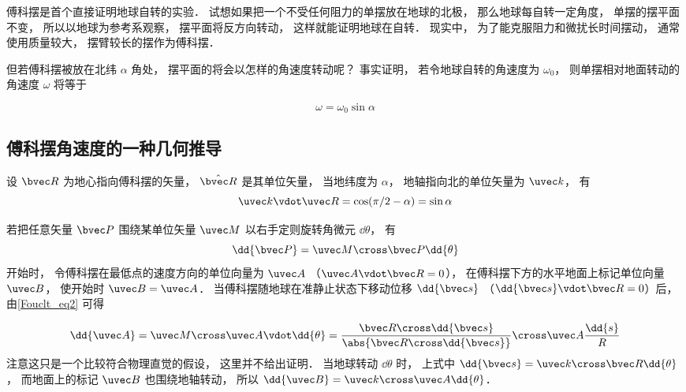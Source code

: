 

傅科摆是首个直接证明地球自转的实验． 试想如果把一个不受任何阻力的单摆放在地球的北极， 那么地球每自转一定角度， 单摆的摆平面不变， 所以以地球为参考系观察， 摆平面将反方向转动， 这样就能证明地球在自转． 现实中， 为了能克服阻力和微扰长时间摆动， 通常使用质量较大， 摆臂较长的摆作为傅科摆．

但若傅科摆被放在北纬 $\alpha$ 角处， 摆平面的将会以怎样的角速度转动呢？ 事实证明， 若令地球自转的角速度为 $\omega_0$， 则单摆相对地面转动的角速度 $\omega$ 将等于

\begin{equation}
\omega = \omega_0 \sin\alpha
\end{equation}

\subsection{傅科摆角速度的一种几何推导}
设 $\bvec R$ 为地心指向傅科摆的矢量， $\hat {\bvec R}$ 是其单位矢量， 当地纬度为 $\alpha$， 地轴指向北的单位矢量为 $\uvec k$， 有
\begin{equation}
\uvec k\vdot \uvec R = \cos(\pi/2 - \alpha) = \sin\alpha
\end{equation}

若把任意矢量 $\bvec P$ 围绕某单位矢量 $\uvec M$ 以右手定则旋转角微元 $\dd{\theta}$， 有
\begin{equation}\label{Fouclt_eq2}
\dd{\bvec P} = \uvec M \cross \bvec P \dd{\theta}
\end{equation}
开始时， 令傅科摆在最低点的速度方向的单位向量为 $\uvec A$ （$\uvec A\vdot \bvec R = 0$）， 在傅科摆下方的水平地面上标记单位向量 $\uvec B$， 使开始时 $\uvec B = \uvec A$． 当傅科摆随地球在准静止状态下移动位移 $\dd{\bvec s}$ （$\dd{\bvec s} \vdot\bvec R = 0$）后， 由\autoref{Fouclt_eq2} 可得

\begin{equation}
\dd{\uvec A} = \uvec M\cross \uvec A\vdot \dd{\theta} = 
\frac{\bvec R\cross \dd{\bvec s}}{\abs{\bvec R\cross \dd{\bvec s}}} \cross \uvec A \frac{\dd{s}}{R}
\end{equation}
注意这只是一个比较符合物理直觉的假设， 这里并不给出证明． 当地球转动 $\dd{\theta}$ 时， 上式中 $\dd{\bvec s} = \uvec k \cross \bvec R \dd{\theta}$， 而地面上的标记 $\uvec B$ 也围绕地轴转动， 所以 $\dd{\uvec B} = \uvec k \cross \uvec A \dd{\theta}$．

